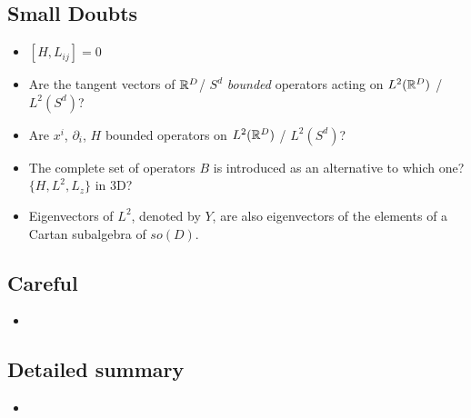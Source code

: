 \documentclass{article}
\begin{document}
\subsection*{Small Doubts}

    \begin{itemize}

    \item $[H, L_{ij}] = 0$
    
    \item Are the tangent vectors of $\mathbb{R}^D$/ $S^d$ \textit{bounded} operators acting on $L^2(\mathbb{R}^D)$ / $L^2(S^d)$?
    
    \item Are $x^i$, $\partial_i$, $H$ bounded operators on $L^2(\mathbb{R}^D)$ / $L^2(S^d)$?
    
    \item The complete set of operators $B$ is introduced as an alternative to which one? $\{H, L^2, L_z\}$ in 3D?
    
    \item Eigenvectors of $L^2$, denoted by $Y$, are also eigenvectors of the elements of a Cartan subalgebra of $so(D)$.
    
    \end{itemize}

\subsection*{Careful}

    \begin{itemize}

    \item 
    
    \end{itemize}

\subsection*{Detailed summary}

    \begin{itemize}

    \item 
    
    \end{itemize}
\end{document}
